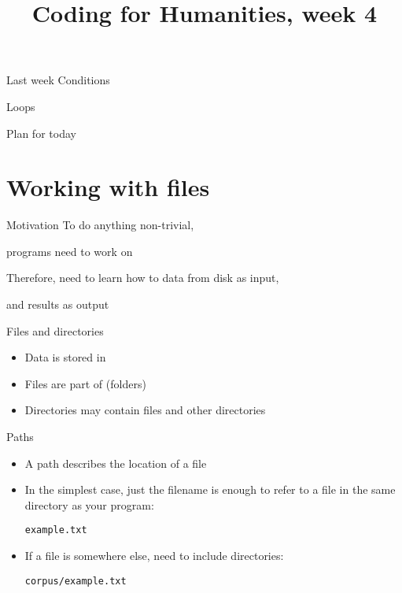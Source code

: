 \documentclass[aspectratio=169,usenames,dvipsnames]{beamer}
\title{Coding for Humanities, week 4}
\begin{document}
\begin{frame}
 \titlepage
\end{frame}

\begin{frame}{Last week}
    Conditions

    Loops
\end{frame}

\begin{frame}{Plan for today}
 \tableofcontents
\end{frame}


\section{Working with files}
\frame{\tableofcontents[currentsection]}

\begin{frame}{Motivation}
    To do anything non-trivial,

    programs need to work on 

    \pause
    Therefore, need to learn how to  data from disk as input,

    and  results as output

\end{frame}


\begin{frame}{Files and directories}
    \begin{itemize}
        \item Data is stored in 
        \item Files are part of  (folders)
        \item Directories may contain files and other directories
    \end{itemize}
\end{frame}

\begin{frame}{Paths}
    \begin{itemize}
        \item A path describes the location of a file
        \item In the simplest case, just the filename is enough to
            refer to a file in the same directory as your program:

            \texttt{example.txt}
        \item If a file is somewhere else, need to include directories:

            \texttt{corpus/example.txt}
    \end{itemize}
\end{frame}
\end{document}
